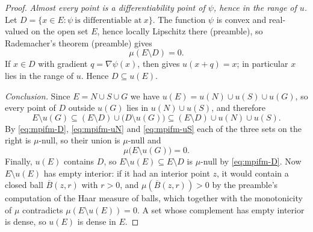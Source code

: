 \begin{proof}
\emph{Almost every point is a differentiability point of $\psi$, hence in the
range of $u$.}
Let $D=\{x\in E:\psi\ \text{is differentiable at}\ x\}$. The function $\psi$ is
convex and real-valued on the open set $E$, hence locally Lipschitz there
(preamble), so Rademacher's theorem (preamble) gives
\begin{equation}\label{eq:mpifm-D}
  \mu(E\setminus D)=0 .
\end{equation}
If $x\in D$ with gradient $q=\nabla\psi(x)$, then 
gives $u(x+q)=x$; in particular $x$ lies in the range of $u$. Hence
$D\subseteq u(E)$.

\emph{Conclusion.}
Since $E=N\cup S\cup G$ we have $u(E)=u(N)\cup u(S)\cup u(G)$, so every point of
$D$ outside $u(G)$ lies in $u(N)\cup u(S)$, and therefore
\[
  E\setminus u(G)\subseteq(E\setminus D)\cup\bigl(D\setminus u(G)\bigr)
   \subseteq(E\setminus D)\cup u(N)\cup u(S).
\]
By \eqref{eq:mpifm-D}, \eqref{eq:mpifm-uN} and \eqref{eq:mpifm-uS} each of the
three sets on the right is $\mu$-null, so their union is $\mu$-null and
\[
  \mu\bigl(E\setminus u(G)\bigr)=0 .
\]
Finally, $u(E)$ contains $D$, so $E\setminus u(E)\subseteq E\setminus D$ is
$\mu$-null by \eqref{eq:mpifm-D}. Now $E\setminus u(E)$ has empty interior: if
it had an interior point $z$, it would contain a closed ball $\overline B(z,r)$
with $r>0$, and $\mu(\overline B(z,r))>0$ by the preamble's computation of the
Haar measure of balls, which together with the monotonicity of $\mu$ contradicts
$\mu(E\setminus u(E))=0$. A set whose complement has empty interior is dense, so
$u(E)$ is dense in $E$.
\end{proof}
